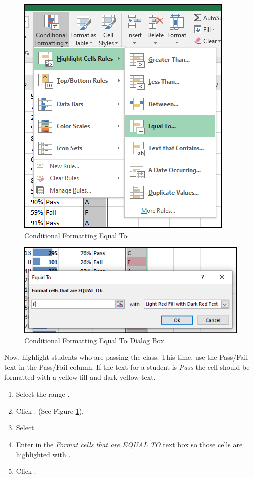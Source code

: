 \begin{figure}[H]
	\centering
	\includegraphics[width=\maxwidth{.95\linewidth}]{gfx/ch03_fig20}
	\caption{Conditional Formatting Equal To}
	\label{03:fig20}
\end{figure}

\begin{figure}[H]
	\centering
	\includegraphics[width=\maxwidth{.95\linewidth}]{gfx/ch03_fig21}
	\caption{Conditional Formatting Equal To Dialog Box}
	\label{03:fig21}
\end{figure}

Now, highlight students who are passing the class. This time, use the Pass/Fail text in the Pass/Fail column. If the text for a student is \textit{Pass} the cell should be formatted with a yellow fill and dark yellow text.

\begin{enumerate}
	\item Select the range .
	\item Click . (See Figure \ref{03:fig20}).
	\item Select 
	\item Enter  in the \textit{Format cells that are EQUAL TO} text box so those cells are highlighted with .
	\item Click .
\end{enumerate}

